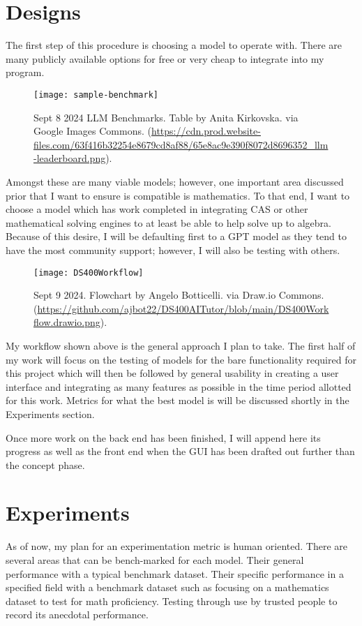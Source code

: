 \documentclass[sigconf,natbib=false]{acmart}
\begin{document}
\section{Designs}
The first step of this procedure is choosing a model to operate with. There are many publicly available options for free or very cheap to integrate into my program.

\begin{figure}[h]
  \centering
  \texttt{[image: sample-benchmark]}
  \caption{Sept 8 2024 LLM Benchmarks. Table by Anita Kirkovska. via Google Images
    Commons. (\url{https://cdn.prod.website-files.com/63f416b32254e8679cd8af88/65e8ac9e390f8072d8696352_llm-leaderboard.png}).}
\end{figure}

Amongst these are many viable models; however, one important area discussed prior that I want to ensure is compatible is mathematics. To that end, I want to choose a model which has work completed in integrating CAS or other mathematical solving engines to at least be able to help solve up to algebra. Because of this desire, I will be defaulting first to a GPT model as they tend to have the most community support; however, I will also be testing with others.

\begin{figure}[h]
  \centering
  \texttt{[image: DS400Workflow]}
  \caption{Sept 9 2024. Flowchart by Angelo Botticelli. via Draw.io
    Commons. (\url{https://github.com/ajbot22/DS400AITutor/blob/main/DS400Workflow.drawio.png}).}
\end{figure}

My workflow shown above is the general approach I plan to take. The first half of my work will focus on the testing of models for the bare functionality required for this project which will then be followed by general usability in creating a user interface and integrating as many features as possible in the time period allotted for this work. Metrics for what the best model is will be discussed shortly in the Experiments section.

Once more work on the back end has been finished, I will append here its progress as well as the front end when the GUI has been drafted out further than the concept phase.

\section{Experiments}
As of now, my plan for an experimentation metric is human oriented. There are several areas that can be bench-marked for each model. Their general performance with a typical benchmark dataset.  Their specific performance in a specified field with a benchmark dataset such as focusing on a mathematics dataset to test for math proficiency. Testing through use by trusted people to record its anecdotal performance.
\end{document}
